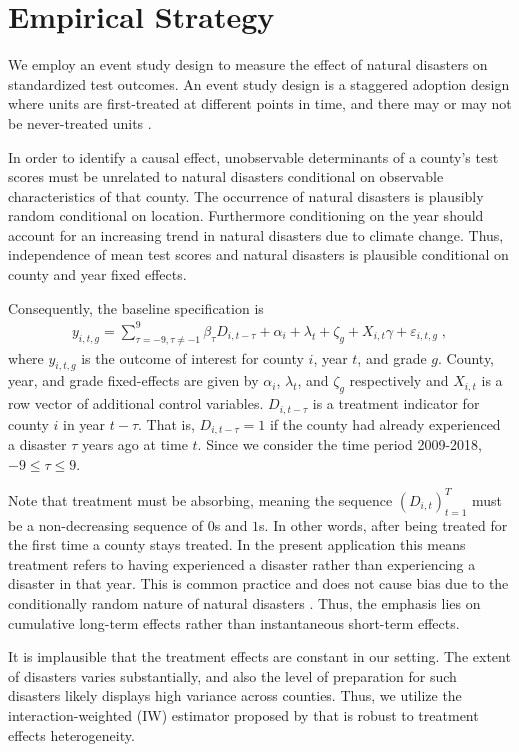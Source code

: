 
\section{Empirical Strategy}

We employ an event study design to measure the effect of natural disasters on standardized test outcomes. An event study design is a staggered adoption design where units are first-treated at different points in time, and there may or may not be never-treated units \citep{Sun_2021}.

In order to identify a causal effect, unobservable determinants of a county's test scores must be unrelated to natural disasters conditional on observable characteristics of that county. The occurrence of natural disasters is plausibly random conditional on location. Furthermore conditioning on the year should account for an increasing trend in natural disasters due to climate change. Thus, independence of mean test scores and natural disasters is plausible conditional on county and year fixed effects.

Consequently, the baseline specification is
\begin{align} \label{baseline}
	y_{i, t, g} = \sum_{\tau = -9, \tau \neq -1}^{9} \beta_\tau D_{i, t-\tau} + \alpha_i + \lambda_t + \zeta_g + X_{i, t} \gamma + \varepsilon_{i, t, g} \;,
\end{align}
where $y_{i, t, g}$ is the outcome of interest for county $i$, year $t$, and grade $g$. County, year, and grade fixed-effects are given by $\alpha_i$, $\lambda_t$, and $\zeta_g$ respectively and $X_{i, t}$ is a row vector of additional control variables. $D_{i, t-\tau}$ is a treatment indicator for county $i$ in year $t-\tau$. That is, $D_{i, t-\tau} = 1$ if the county had already experienced a disaster $\tau$ years ago at time $t$. Since we consider the time period 2009-2018, $-9 \leq \tau \leq 9$.

Note that treatment must be absorbing, meaning the sequence $(D_{i, t})_{t=1}^T$ must be a non-decreasing sequence of $0$s and $1$s. In other words, after being treated for the first time a county stays treated. In the present application this means treatment refers to having experienced a disaster rather than experiencing a disaster in that year. This is common practice and does not cause bias due to the conditionally random nature of natural disasters \citep{Deryugina_2017}. Thus, the emphasis lies on cumulative long-term effects rather than instantaneous short-term effects.

It is implausible that the treatment effects are constant in our setting. The extent of disasters varies substantially, and also the level of preparation for such disasters likely displays high variance across counties. Thus, we utilize the interaction-weighted (IW) estimator proposed by \cite{Sun_2021} that is robust to treatment effects heterogeneity.

